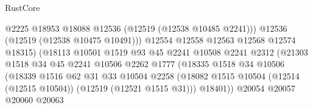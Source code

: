 \begin{lexlean}{RustCore}
\begin{coremodule}
                                            @2225
                                            @18953
                                            @18088
                                            @12536
                                            (@12519 (@12538 @10485 @2241)))
                                          @12536
                                          (@12519 (@12538 @10475 @10491)))
                                        @12554
                                        @12558
                                        @12563
                                        @12568
                                        @12574
                                        @18315)
                                      (@18113
                                        @10501
                                        @1519
                                        @93
                                        @45
                                        @2241
                                        @10508
                                        @2241
                                        @2312
                                        (@21303
                                          @1518
                                          @34
                                          @45
                                          @2241
                                          @10506
                                          @2262
                                          @1777
                                          (@18335
                                            @1518
                                            @34
                                            @10506
                                            (@18339
                                              @1516
                                              @62
                                              @31
                                              @33
                                              @10504
                                              @2258
                                              (@18082
                                                @1515
                                                @10504
                                                (@12514 (@12515 @10504))
                                                (@12519 (@12521 @1515 @31)))
                                              @18401))
                                          @20054
                                          @20057
                                          @20060
                                          @20063

\end{coremodule}
\end{lexlean}
